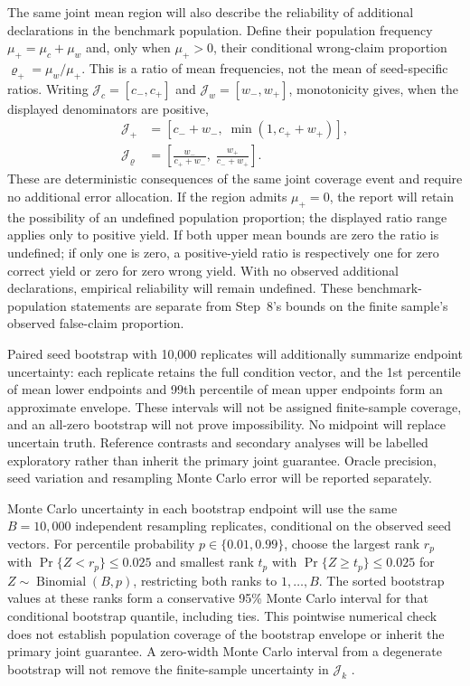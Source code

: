 \documentclass[11pt,a4paper]{article}
\begin{document}
The same joint mean region will also describe the reliability of additional
declarations in the benchmark population. Define their population frequency
$\mu_+=\mu_c+\mu_w$ and, only when $\mu_+>0$, their conditional wrong-claim
proportion $\varrho_+=\mu_w/\mu_+$. This is a ratio of mean frequencies,
not the mean of seed-specific ratios. Writing
$\mathcal J_c=[c_-,c_+]$ and $\mathcal J_w=[w_-,w_+]$, monotonicity gives,
when the displayed denominators are positive,
\begin{align}
\mathcal J_+&=[c_-+w_-,\;\min(1,c_++w_+)],\\
\mathcal J_{\varrho}&=
\left[\frac{w_-}{c_++w_-},\;\frac{w_+}{c_-+w_+}\right].
\end{align}
These are deterministic consequences of the same joint coverage event and
require no additional error allocation. If the region admits $\mu_+=0$,
the report will retain the possibility of an undefined population proportion;
the displayed ratio range applies only to positive yield. If both upper mean
bounds are zero the ratio is undefined; if only one is zero, a positive-yield
ratio is respectively one for zero correct yield or zero for zero wrong yield.
With no observed additional declarations, empirical reliability will remain
undefined.
These benchmark-population statements are separate from Step~8's bounds on
the finite sample's observed false-claim proportion.

Paired seed bootstrap with 10,000 replicates will additionally summarize endpoint
uncertainty: each replicate retains the full condition vector, and the 1st
percentile of mean lower endpoints and 99th percentile of mean upper endpoints
form an approximate envelope. These intervals will not be assigned finite-sample
coverage, and an all-zero bootstrap will not prove impossibility. No midpoint
will replace uncertain truth. Reference contrasts and secondary analyses will
be labelled exploratory rather than inherit the primary joint guarantee.
Oracle precision, seed variation and resampling Monte Carlo error will be
reported separately.

Monte Carlo uncertainty in each bootstrap endpoint will use the same
$B=10{,}000$ independent resampling replicates, conditional on the observed
seed vectors. For percentile probability $p\in\{0.01,0.99\}$, choose the
largest rank $r_p$ with $\Pr\{Z<r_p\}\leq0.025$ and smallest rank $t_p$
with $\Pr\{Z\geq t_p\}\leq0.025$ for
$Z\sim\operatorname{Binomial}(B,p)$, restricting both ranks to $1,\ldots,B$.
The sorted bootstrap values at these ranks form a conservative 95\%
Monte Carlo interval for that conditional bootstrap quantile, including ties.
This pointwise numerical check does not establish population coverage of the
bootstrap envelope or inherit the primary joint guarantee. A zero-width
Monte Carlo interval from a degenerate bootstrap will not remove the
finite-sample uncertainty in $\mathcal J_k$ \cite{nistquantiles}.
\end{document}
